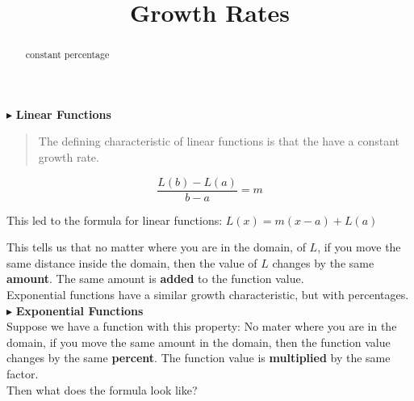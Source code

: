 \documentclass{ximera}
\title{Growth Rates}
\begin{document}
\begin{abstract}
constant percentage
\end{abstract}
\maketitle










$\blacktriangleright$ \textbf{\textcolor{purple!85!blue}{Linear Functions}}   \\


\begin{quote}
The defining characteristic of linear functions is that the have a constant growth rate.
\end{quote}





\[   \frac{L(b)-L(a)}{b-a} = m       \]

This led to the formula for linear functions:  $L(x) = m(x-a) + L(a)$


This tells us that no matter where you are in the domain, of $L$, if you move the same distance inside the domain, then the value of $L$ changes by the same \textbf{\textcolor{purple!85!blue}{amount}}. The same amount is \textbf{added} to the function value.\\






Exponential functions have a similar growth characteristic, but with percentages. \\



$\blacktriangleright$ \textbf{\textcolor{purple!85!blue}{Exponential Functions}} \\



Suppose we have a function with this property:  No mater where you are in the domain, if you move the same amount in the domain, then the function value changes by the same \textbf{\textcolor{purple!85!blue}{percent}}.  The function value is \textbf{multiplied} by the same factor. \\

Then what does the formula look like?
\end{document}
